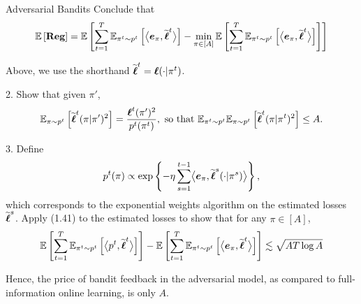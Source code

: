 \begin{exercise}[]{Adversarial Bandits}
Conclude that 
\[ \EE{\Reg} = \EE{\sum_{t=1}^T \EEs{\biprod{\boldsymbol{e}_\pi}{\wt \bsl^t}}{\pi^t \sim p^t}  -\min_{\pi \in [A]}\EE{\sum_{t=1}^T\EEs{\biprod{\boldsymbol{e}_\pi}{\wt \bsl^t}}{\pi^t \sim p^t}}}\]

Above, we use the shorthand $\wt \bsl^t = \bsl(\cdot|\pi^t)$.
        
2. Show that given $\pi'$,
\[ \EEs{\wt \bsl^t(\pi|\pi')^2}{\pi \sim p^t}= \frac{\bsl^t(\pi')^2}{p^t(\pi^t)}, \text{ so that  } \mathbb{E}_{\pi^t\sim p^t}\EEs{\wt \bsl^t(\pi | \pi^t)^2}{\pi \sim p^t}\leq A.\]

3. Define \[ p^t(\pi) \propto \exp \left\{-\eta \sum_{s=1}^{t-1}\biprod{\boldsymbol{e}_\pi}{\wt \bsl^s(\cdot|\pi^s)}\right\},\]
which corresponds to the exponential weights algorithm on the estimated losses $\wt \bsl^s$.
 Apply (1.41) to the estimated losses to show that for any $\pi \in [A]$,
 \[ \EE{\sum_{t=1}^T \EEs{\biprod{p^t}{\wt \bsl^t}}{\pi^t \sim p^t}}-\EE{\sum_{t=1}^T \EEs{\biprod{\boldsymbol{e}_\pi}{\wt \bsl^t}}{\pi^t \sim p^t}} \lesssim \sqrt{AT\log A}\]

 Hence, the price of bandit feedback in the adversarial model, as compared to full-information online learning, is only $A$.
\end{exercise}

\begin{solution}[TODO]
\end{solution}
